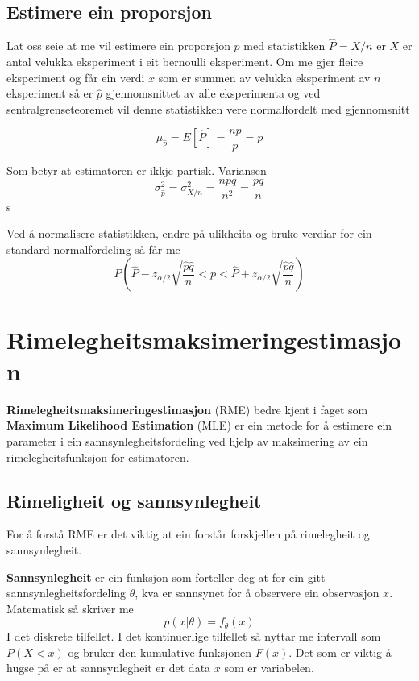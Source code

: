 \subsection{Estimere ein proporsjon}
Lat oss seie at me vil estimere ein proporsjon $p$ med statistikken $\hat{P} = X/n$ er $X$ er antal velukka eksperiment i eit bernoulli eksperiment. Om me gjer fleire eksperiment og får ein verdi $x$ som er summen av velukka eksperiment av $n$ eksperiment så er $\hat{p}$ gjennomsnittet av alle eksperimenta og ved sentralgrenseteoremet vil denne statistikken vere normalfordelt med gjennomsnitt

\begin{equation}
    \mu_{\hat{p}} = E[\hat{P}] = \frac{np}{p} = p
\end{equation}

Som betyr at estimatoren er ikkje-partisk. Variansen
\begin{equation}
    \sigma^2_{\hat{p}} = \sigma^2_{X/n} = \frac{npq}{n^2} = \frac{pq}{n}
\end{equation}s

Ved å normalisere statistikken, endre på ulikheita og bruke verdiar for ein standard normalfordeling så får me
\begin{equation}
    P\left( \hat{P}-z_{\alpha/2}\sqrt{\frac{\hat{p}\hat{q}}{n}} < p < \hat{P} + z_{\alpha/2}\sqrt{\frac{\hat{p}\hat{q}}{n}} \right)
\end{equation}

\section{Rimelegheitsmaksimeringestimasjon}
\textbf{Rimelegheitsmaksimeringestimasjon} (RME) bedre kjent i faget som \textbf{Maximum Likelihood Estimation} (MLE) er ein metode for å estimere ein parameter i ein sannsynlegheitsfordeling ved hjelp av maksimering av ein rimelegheitsfunksjon for estimatoren.

\subsection{Rimeligheit og sannsynlegheit}

For å forstå RME er det viktig at ein forstår forskjellen på rimelegheit og sannsynlegheit.

\textbf{Sannsynlegheit} er ein funksjon som forteller deg at for ein gitt sannsynlegheitsfordeling $\theta$, kva er sannsynet for å observere ein observasjon $x$. Matematisk så skriver me
\begin{equation}
    p(x | \theta) = f_\theta(x)
\end{equation}
I det diskrete tilfellet. I det kontinuerlige tilfellet så nyttar me intervall som $P(X < x)$ og bruker den kumulative funksjonen $F(x)$. Det som er viktig å hugse på er at sannsynlegheit er det data $x$ som er variabelen\cite{wiki:likelihood}.


